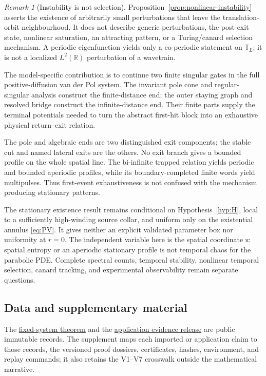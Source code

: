 \documentclass[11pt,reqno]{amsart}
\numberwithin{equation}{section}
\theoremstyle{definition}
\theoremstyle{remark}
\newtheorem{remark}[theorem]{Remark}
\begin{document}
\begin{remark}[Instability is not selection]
Proposition~\ref{prop:nonlinear-instability} asserts the existence of
arbitrarily small perturbations that leave the translation-orbit
neighbourhood.  It does not describe generic perturbations, the post-exit
state, nonlinear saturation, an attracting pattern, or a Turing/canard
selection mechanism.  A periodic eigenfunction yields only a co-periodic
statement on $\mathbb T_L$; it is not a localized $L^2(\mathbb R)$
perturbation of a wavetrain.
\end{remark}

The model-specific contribution is to continue two finite singular gates in
the full positive-diffusion van der Pol system.  The invariant pole cone and
regular-singular analysis construct the finite-distance end; the outer
staying graph and resolved bridge construct the infinite-distance end.  Their
finite parts supply the terminal potentials needed to turn the abstract
first-hit block into an exhaustive physical return--exit relation.

The pole and algebraic ends are two distinguished exit components; the stable
cut and named lateral exits are the others.  No exit branch gives a bounded
profile on the whole spatial line.  The bi-infinite trapped relation yields
periodic and bounded aperiodic profiles, while its boundary-completed finite
words yield multipulses.  Thus first-event exhaustiveness is not confused
with the mechanism producing stationary patterns.

The stationary existence result remains conditional on
Hypothesis~\ref{hyp:H}, local to a
sufficiently high-winding source collar, and uniform only on the existential
annulus \eqref{eq:PV}.  It gives neither an explicit validated parameter box
nor uniformity at $r=0$.  The independent variable here is the spatial
coordinate $\mathsf x$: spatial entropy or an aperiodic stationary profile is
not temporal chaos for the parabolic PDE.  Complete spectral counts,
temporal stability, nonlinear temporal selection, canard tracking, and
experimental observability remain separate questions.

\subsection*{Data and supplementary material}

The \href{https://doi.org/10.5281/zenodo.22139860}{fixed-system theorem} and
the
\href{https://github.com/h-lu/rfsn-ii-positive-parameter-pde/releases/tag/vdp-companion-v1}{application evidence release}
are public immutable records.  The supplement maps each imported or
application claim to those records, the versioned proof dossiers,
certificates, hashes, environment, and replay commands; it also retains the
V1--V7 crosswalk outside the mathematical narrative.



\end{document}

